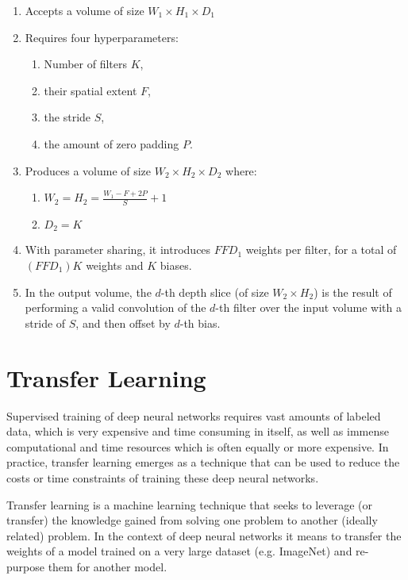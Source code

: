 \begin{enumerate}
    \item Accepts a volume of size $W_1 \times H_1 \times D_1$
    \item Requires four hyperparameters:
    \begin{enumerate}
        \item Number of filters $K$,
        \item their spatial extent $F$,
        \item the stride $S$,
        \item the amount of zero padding $P$.
    \end{enumerate}
    \item Produces a volume of size $W_2 \times H_2 \times D_2$ where:
    \begin{enumerate}
        \item $W_2 = H_2 = \frac{W_1 - F + 2P}{S} + 1$
        \item $D_2 = K$
    \end{enumerate}
    \item With parameter sharing, it introduces $F F D_1$ weights per filter, for a total of $(F F D_1) K$ weights and $K$ biases.
    \item In the output volume, the $d$-th depth slice (of size $W_2 \times H_2$) is the result of performing a valid convolution of the $d$-th filter over the input volume with a stride of $S$, and then offset by $d$-th bias.
\end{enumerate}

\section{Transfer Learning}

Supervised training of deep neural networks requires vast amounts of labeled data, which is very expensive and time consuming in itself, as well as immense computational and time resources which is often equally or more expensive. In practice, transfer learning emerges as a technique that can be used to reduce the costs or time constraints of training these deep neural networks.

Transfer learning is a machine learning technique that seeks to leverage (or transfer) the knowledge gained from solving one problem to another (ideally related) problem. In the context of deep neural networks it means to transfer the weights of a model trained on a very large dataset (e.g. ImageNet\cite{imagenet}) and re-purpose them for another model.

